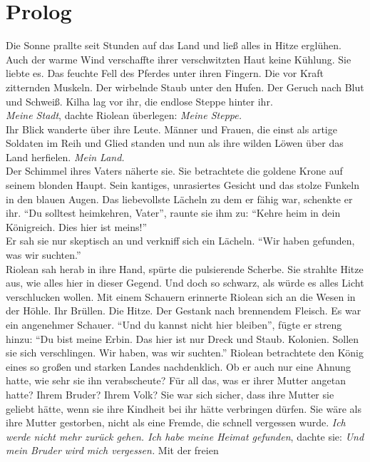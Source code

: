 \chapter{Prolog}

Die Sonne prallte seit Stunden auf das Land und ließ alles in Hitze erglühen. Auch der warme Wind 
verschaffte ihrer verschwitzten Haut keine Kühlung. Sie liebte es. Das feuchte Fell des Pferdes 
unter ihren Fingern. Die vor Kraft zitternden Muskeln. Der wirbelnde Staub unter den Hufen. Der 
Geruch nach Blut und Schweiß. Kilha lag vor ihr, die endlose Steppe hinter ihr.\\
\textit{Meine Stadt}, dachte Riolean überlegen: \textit{Meine Steppe.}\\
Ihr Blick wanderte über ihre Leute. Männer und Frauen, die einst als artige Soldaten im Reih und 
Glied standen und nun als ihre wilden Löwen über das Land herfielen. \textit{Mein Land.}\\
Der Schimmel ihres Vaters näherte sie. Sie betrachtete die goldene Krone auf seinem blonden Haupt. 
Sein kantiges, unrasiertes Gesicht und das stolze Funkeln in den blauen Augen. Das liebevollste 
Lächeln zu dem er fähig war, schenkte er ihr. ``Du solltest heimkehren, Vater'', raunte sie ihm zu: 
``Kehre heim in dein Königreich. Dies hier ist meins!''\\
Er sah sie nur skeptisch an und verkniff sich ein Lächeln. ``Wir haben gefunden, was wir 
suchten.''\\
Riolean sah herab in ihre Hand, spürte die pulsierende Scherbe. Sie strahlte Hitze aus, wie alles 
hier in dieser Gegend. Und doch so schwarz, als würde es alles Licht verschlucken wollen. Mit einem 
Schauern erinnerte Riolean sich an die Wesen in der Höhle. Ihr Brüllen. Die Hitze. Der Gestank nach 
brennendem Fleisch. Es war ein angenehmer Schauer. ``Und du kannst nicht hier bleiben'', fügte er 
streng hinzu: ``Du bist meine Erbin. Das hier ist nur Dreck und Staub. Kolonien. Sollen sie sich 
verschlingen. Wir haben, was wir suchten.''
Riolean betrachtete den König eines so großen und starken Landes nachdenklich. Ob er auch nur 
eine Ahnung hatte, wie sehr sie ihn verabscheute? Für all das, was er ihrer Mutter angetan 
hatte? Ihrem Bruder? Ihrem Volk? Sie war sich sicher, dass ihre Mutter sie geliebt hätte, wenn 
sie ihre Kindheit bei ihr hätte verbringen dürfen. Sie wäre als ihre Mutter gestorben, nicht als 
eine Fremde, die schnell vergessen wurde. \textit{Ich werde nicht mehr zurück gehen. Ich habe 
meine Heimat gefunden}, dachte sie: \textit{Und mein Bruder wird mich vergessen.} Mit der freien 

